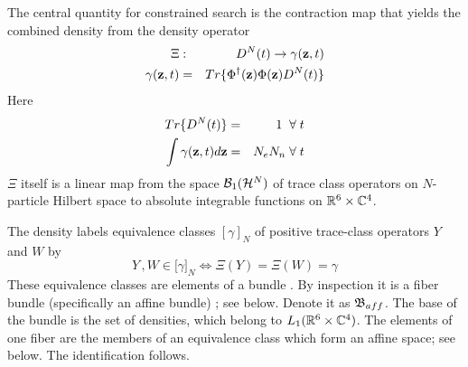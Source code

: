 The central quantity for constrained search is the contraction map that
yields the combined density from the density operator 
\begin{eqnarray}
\Xi  &:&D^{N}(t)\rightarrow \gamma ({\bf z},t)  \nonumber \\
\gamma ({\bf z},t) &=&Tr\{\Phi ^{\dagger }({\bf z})\Phi ({\bf z})D^{N}(t)\}
\label{Xidefn}
\end{eqnarray}%
Here 
\begin{eqnarray}
Tr\{D^{N}(t)\} &=&1\;\;\forall \;t  \nonumber \\
\int \gamma ({\bf z},t)d{\bf z} &=&N_{e}N_{n}\;\forall \;t
\end{eqnarray}%
$\Xi $ itself is a linear map from the space ${\cal B}_{1}({\cal H}^{N})$ of
trace class operators on $N$-particle Hilbert space to absolute integrable
functions on ${\Bbb R}^{6}\times {\Bbb C}^{4}$.

The density labels equivalence classes $[\gamma ]_{N}$ of positive
trace-class operators $Y$ and $W$ by 
\begin{equation}
Y\,,W\in \lbrack \gamma ]_{N}\Leftrightarrow \Xi (Y)=\Xi (W)=\gamma
\end{equation}%
These equivalence classes are elements of a bundle \cite{Bruhat}. By
inspection it is a fiber bundle (specifically an affine bundle) \cite%
{affinebundleref}; see below. Denote it as ${\frak B}_{aff}$. The base of
the bundle is the set of densities, which belong to $L_{1}({\Bbb R}%
^{6}\times {\Bbb C}^{4})$. The elements of one fiber are the members of an
equivalence class which form an affine space; see below. The identification
follows.

